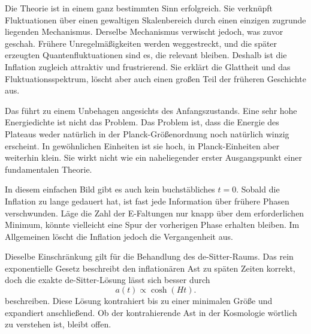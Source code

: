 Die Theorie ist in einem ganz bestimmten Sinn erfolgreich. Sie verknüpft Fluktuationen über einen gewaltigen Skalenbereich durch einen einzigen zugrunde liegenden Mechanismus. Derselbe Mechanismus verwischt jedoch, was zuvor geschah. Frühere Unregelmäßigkeiten werden weggestreckt, und die später erzeugten Quantenfluktuationen sind es, die relevant bleiben. Deshalb ist die Inflation zugleich attraktiv und frustrierend. Sie erklärt die Glattheit und das Fluktuationsspektrum, löscht aber auch einen großen Teil der früheren Geschichte aus.

Das führt zu einem Unbehagen angesichts des Anfangszustands. Eine sehr hohe Energiedichte ist nicht das Problem. Das Problem ist, dass die Energie des Plateaus weder natürlich in der Planck-Größenordnung noch natürlich winzig erscheint. In gewöhnlichen Einheiten ist sie hoch, in Planck-Einheiten aber weiterhin klein. Sie wirkt nicht wie ein naheliegender erster Ausgangspunkt einer fundamentalen Theorie.

In diesem einfachen Bild gibt es auch kein buchstäbliches \(t=0\). Sobald die Inflation zu lange gedauert hat, ist fast jede Information über frühere Phasen verschwunden. Läge die Zahl der E-Faltungen nur knapp über dem erforderlichen Minimum, könnte vielleicht eine Spur der vorherigen Phase erhalten bleiben. Im Allgemeinen löscht die Inflation jedoch die Vergangenheit aus.

Dieselbe Einschränkung gilt für die Behandlung des de-Sitter-Raums. Das rein exponentielle Gesetz beschreibt den inflationären Ast zu späten Zeiten korrekt, doch die exakte de-Sitter-Lösung lässt sich besser durch
\begin{equation}
a(t)\propto \cosh(Ht).
\end{equation}
beschreiben. Diese Lösung kontrahiert bis zu einer minimalen Größe und expandiert anschließend. Ob der kontrahierende Ast in der Kosmologie wörtlich zu verstehen ist, bleibt offen.

\begin{classroomqa}
\end{classroomqa}

